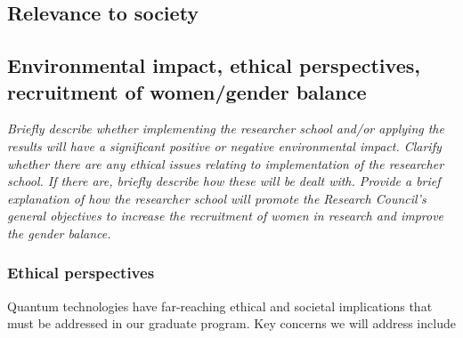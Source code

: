 \documentclass{scrreprt}
\begin{document}
\subsection{Relevance to society}


\subsection{Environmental impact, ethical perspectives, recruitment of women/gender balance }

{\em Briefly describe whether implementing the researcher school and/or applying the results will have a significant positive or negative environmental impact. Clarify whether there are any ethical issues relating to implementation of the researcher school. If there are, briefly describe how these will be dealt with. Provide a brief explanation of how the researcher school will promote the Research Council’s general objectives to increase the recruitment of women in research and improve the gender balance.}


\subsubsection{Ethical perspectives}
Quantum technologies have far-reaching ethical and societal implications that must be addressed in our  graduate program. Key concerns we will address include
\end{document}

